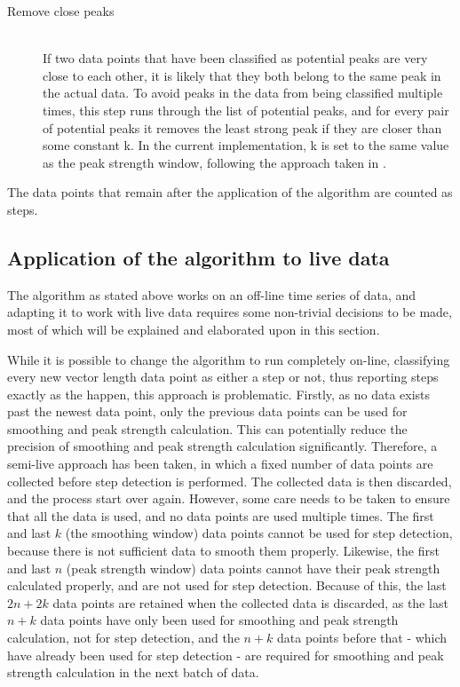 \begin{description}
\item[Remove close peaks] \hfill \\
If two data points that have been classified as potential peaks are very close to each other, it is likely that they both belong to the same peak in the actual data. To avoid peaks in the data from being classified multiple times, this step runs through the list of potential peaks, and for every pair of potential peaks it removes the least strong peak if they are closer than some constant k. In the current implementation, k is set to the same value as the peak strength window, following the approach taken in \cite{SimplePeakDetect}.

\end{description}

The data points that remain after the application of the algorithm are counted as steps.

\subsection{Application of the algorithm to live data}
The algorithm as stated above works on an off-line time series of data, and adapting it to work with live data requires some non-trivial decisions to be made, most of which will be explained and elaborated upon in this section. 

While it is possible to change the algorithm to run completely on-line, classifying every new vector length data point as either a step or not, thus reporting steps exactly as the happen, this approach is problematic. Firstly, as no data exists past the newest data point, only the previous data points can be used for smoothing and peak strength calculation. This can potentially reduce the precision of smoothing and peak strength calculation significantly. Therefore, a semi-live approach has been taken, in which a fixed number of data points are collected before step detection is performed. The collected data is then discarded, and the process start over again. However, some care needs to be taken to ensure that all the data is used, and no data points are used multiple times. The first and last $k$ (the smoothing window) data points cannot be used for step detection, because there is not sufficient data to smooth them properly. Likewise, the first and last $n$ (peak strength window) data points cannot have their peak strength calculated properly, and are not used for step detection. Because of this, the last $2n + 2k$ data points are retained when the collected data is discarded, as the last $n+k$ data points have only been used for smoothing and peak strength calculation, not for step detection, and the $n+k$ data points before that - which have already been used for step detection - are required for smoothing and peak strength calculation in the next batch of data.


